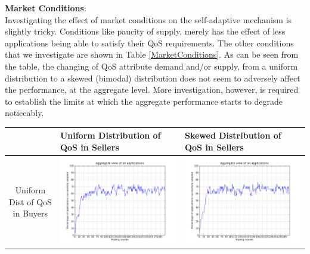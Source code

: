 \documentclass[10pt,journal,compsoc]{IEEEtran}
\begin{document}
\textbf{Market Conditions}:\\
Investigating the effect of market conditions on the self-adaptive mechanism is slightly tricky. Conditions like paucity of supply, merely has the effect of less applications being able to satisfy their QoS requirements. The other conditions that we investigate are shown in Table \ref{MarketConditions}. As can be seen from the table, the changing of QoS attribute demand and/or supply, from a uniform distribution to a skewed (bimodal) distribution does not seem to adversely affect the performance, at the aggregate level. More investigation, however, is required to establish the limits at which the aggregate performance starts to degrade noticeably.
\begin{center}
\begin{table}[ht]
 \begin{tabular}{| c | l | l |}
 \hline
 & \small Uniform Distribution of QoS in Sellers & \small Skewed Distribution of QoS in Sellers\\ \hline
 \small Uniform Dist of QoS in Buyers & \includegraphics[scale=0.34] {graphs/uniform-seller-uniform-buyer.png} & \includegraphics[scale=0.34] {graphs/uniform-seller-skewed-buyer.png}\\ \hline

\end{tabular}
\end{table}
\end{center}
\end{document}
